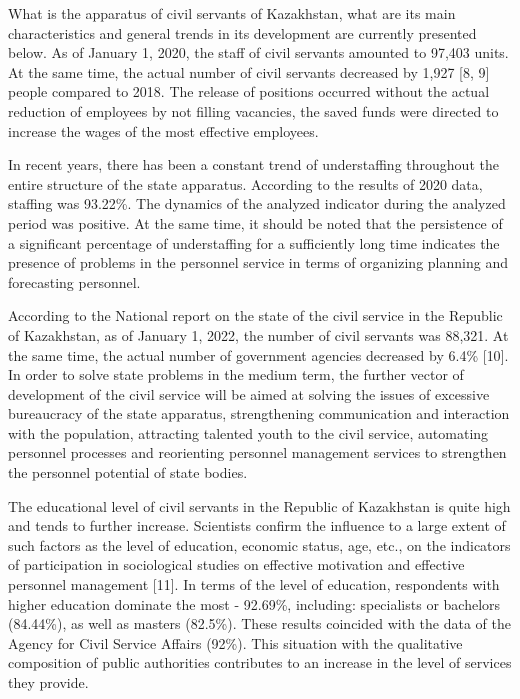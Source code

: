 \begin{multicols}{2}
What is the apparatus of civil servants of Kazakhstan, what are its main
characteristics and general trends in its development are currently
presented below. As of January 1, 2020, the staff of civil servants
amounted to 97,403 units. At the same time, the actual number of civil
servants decreased by 1,927 {[}8, 9{]} people compared to 2018. The
release of positions occurred without the actual reduction of employees
by not filling vacancies, the saved funds were directed to increase the
wages of the most effective employees.

In recent years, there has been a constant trend of understaffing
throughout the entire structure of the state apparatus. According to the
results of 2020 data, staffing was 93.22\%. The dynamics of the analyzed
indicator during the analyzed period was positive. At the same time, it
should be noted that the persistence of a significant percentage of
understaffing for a sufficiently long time indicates the presence of
problems in the personnel service in terms of organizing planning and
forecasting personnel.

According to the National report on the state of the civil service in
the Republic of Kazakhstan, as of January 1, 2022, the number of civil
servants was 88,321. At the same time, the actual number of government
agencies decreased by 6.4\% {[}10{]}. In order to solve state problems
in the medium term, the further vector of development of the civil
service will be aimed at solving the issues of excessive bureaucracy of
the state apparatus, strengthening communication and interaction with
the population, attracting talented youth to the civil service,
automating personnel processes and reorienting personnel management
services to strengthen the personnel potential of state bodies.

The educational level of civil servants in the Republic of Kazakhstan is
quite high and tends to further increase. Scientists confirm the
influence to a large extent of such factors as the level of education,
economic status, age, etc., on the indicators of participation in
sociological studies on effective motivation and effective personnel
management {[}11{]}. In terms of the level of education, respondents
with higher education dominate the most - 92.69\%, including:
specialists or bachelors (84.44\%), as well as masters (82.5\%). These
results coincided with the data of the Agency for Civil Service Affairs
(92\%). This situation with the qualitative composition of public
authorities contributes to an increase in the level of services they
provide.


\end{multicols}
